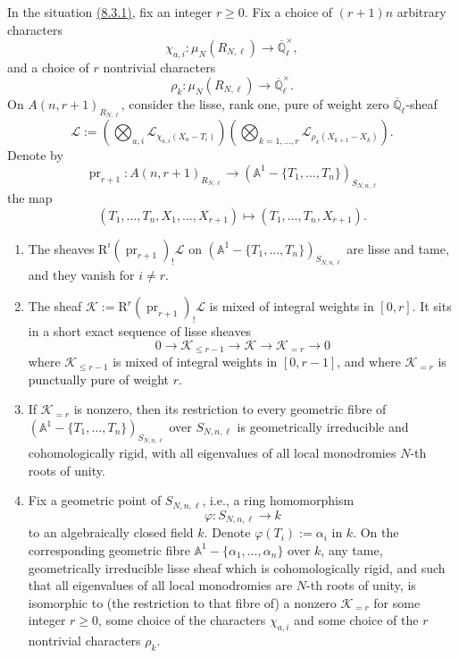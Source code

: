 In the situation \hyperref[par:8.3.1]{(8.3.1)}, fix an integer \(r\geq0\). Fix a choice of \((r+1)n\) arbitrary characters
\[
\chi_{a,i}:\mu_N(R_{N,\ell})\to\overline{\mathbb{Q}}_\ell^{\times},
\]
and a choice of \(r\) nontrivial characters
\[
\rho_k:\mu_N(R_{N,\ell})\to\overline{\mathbb{Q}}_\ell^{\times}.
\]
On \(A(n,r+1)_{R_{N,\ell}}\), consider the lisse, rank one, pure of weight zero \(\overline{\mathbb{Q}}_\ell\)-sheaf
\[
\mathcal{L}:=\left(\bigotimes_{a,i}\mathcal{L}_{\chi_{a,i}(X_a-T_i)}\right)\left(\bigotimes_{k=1,\ldots,r}\mathcal{L}_{\rho_k(X_{k+1}-X_k)}\right).
\]
Denote by
\[
\operatorname{pr}_{r+1}:A(n,r+1)_{R_{N,\ell}}\to(\mathbb{A}^1-\{T_1,\ldots,T_n\})_{S_{N,n,\ell}}
\]
the map
\[
(T_1,\ldots,T_n,X_1,\ldots,X_{r+1})\mapsto(T_1,\ldots,T_n,X_{r+1}).
\]
\begin{enumerate}[label=(\arabic*)]
\item The sheaves \(\mathrm{R}^i(\operatorname{pr}_{r+1})_!\mathcal{L}\) on \((\mathbb{A}^1-\{T_1,\ldots,T_n\})_{S_{N,n,\ell}}\) are lisse and tame, and they vanish for \(i\ne r\).
\item The sheaf \(\mathcal{K}:=\mathrm{R}^r(\operatorname{pr}_{r+1})_!\mathcal{L}\) is mixed of integral weights in \([0,r]\). It sits in a short exact sequence of lisse sheaves
\[
0\to\mathcal{K}_{\leq r-1}\to\mathcal{K}\to\mathcal{K}_{=r}\to0
\]
where \(\mathcal{K}_{\leq r-1}\) is mixed of integral weights in \([0,r-1]\), and where \(\mathcal{K}_{=r}\) is punctually pure of weight \(r\).
\item If \(\mathcal{K}_{=r}\) is nonzero, then its restriction to every geometric fibre of \((\mathbb{A}^1-\{T_1,\ldots,T_n\})_{S_{N,n,\ell}}\) over \(S_{N,n,\ell}\) is geometrically irreducible and cohomologically rigid, with all eigenvalues of all local monodromies \(N\)-th roots of unity.
\item Fix a geometric point of \(S_{N,n,\ell}\), i.e., a ring homomorphism
\[
\varphi:S_{N,n,\ell}\to k
\]
to an algebraically closed field \(k\). Denote \(\varphi(T_i):=\alpha_i\) in \(k\). On the corresponding geometric fibre \(\mathbb{A}^1-\{\alpha_1,\ldots,\alpha_n\}\) over \(k\), any tame, geometrically irreducible lisse sheaf which is cohomologically rigid, and such that all eigenvalues of all local monodromies are \(N\)-th roots of unity, is isomorphic to (the restriction to that fibre of) a nonzero \(\mathcal{K}_{=r}\) for some integer \(r\geq0\), some choice of the characters \(\chi_{a,i}\) and some choice of the \(r\) nontrivial characters \(\rho_k\).
\end{enumerate}
